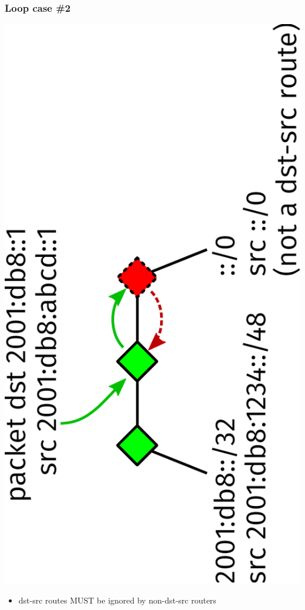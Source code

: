 \documentclass[12pt]{beamer}
\begin{document}
\begin{frame}
  \frametitle{Loop case \#2}
  \includegraphics[scale=0.45,angle=-90]{isis_loop2.pdf}%
  \vspace{10mm}
  \begin{itemize}
    \item dst-src routes MUST be ignored by non-dst-src routers
  \end{itemize}
\end{frame}
\end{document}
